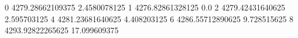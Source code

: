 0 4279.28662109375 2.4580078125
1 4276.82861328125 0.0
2 4279.42431640625 2.595703125
4 4281.23681640625 4.408203125
6 4286.55712890625 9.728515625
8 4293.92822265625 17.099609375
